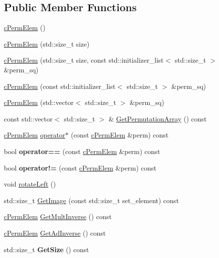 \subsection*{Public Member Functions}
\begin{DoxyCompactItemize}
\item 
\hyperlink{classcPermElem_a9170fa558dd3cdfae7879631db41235d}{c\-Perm\-Elem} ()
\item 
\hyperlink{classcPermElem_ad3ff2e93580acca710249f0eb7e04bc3}{c\-Perm\-Elem} (std\-::size\-\_\-t size)
\item 
\hyperlink{classcPermElem_a375e3da4877dd48e93ca192bfcd66ddd}{c\-Perm\-Elem} (std\-::size\-\_\-t size, const std\-::initializer\-\_\-list$<$ std\-::size\-\_\-t $>$ \&perm\-\_\-sq)
\item 
\hyperlink{classcPermElem_a88b976442227c8da9ede9cf9d3f865c5}{c\-Perm\-Elem} (const std\-::initializer\-\_\-list$<$ std\-::size\-\_\-t $>$ \&perm\-\_\-sq)
\item 
\hyperlink{classcPermElem_a05895c11888d83bc3d35b3c18d90e8e4}{c\-Perm\-Elem} (std\-::vector$<$ std\-::size\-\_\-t $>$ \&perm\-\_\-sq)
\item 
const std\-::vector$<$ std\-::size\-\_\-t $>$ \& \hyperlink{classcPermElem_a1b5d12f8fb6131643253f5ed3bad6c28}{Get\-Permutation\-Array} () const 
\item 
\hyperlink{classcPermElem}{c\-Perm\-Elem} \hyperlink{classcPermElem_a19da6e521f8adf3d252250f3836c563e}{operator$\ast$} (const \hyperlink{classcPermElem}{c\-Perm\-Elem} \&perm) const 
\item 
\hypertarget{classcPermElem_a925aac2e4ac73ec288b7a1e16b941d40}{bool {\bfseries operator==} (const \hyperlink{classcPermElem}{c\-Perm\-Elem} \&perm) const }\label{classcPermElem_a925aac2e4ac73ec288b7a1e16b941d40}

\item 
\hypertarget{classcPermElem_a925cdee12dcc4914417143a88d91c49d}{bool {\bfseries operator!=} (const \hyperlink{classcPermElem}{c\-Perm\-Elem} \&perm) const }\label{classcPermElem_a925cdee12dcc4914417143a88d91c49d}

\item 
void \hyperlink{classcPermElem_afa5694d1831e653f4cc3b12de6bb058e}{rotate\-Left} ()
\item 
std\-::size\-\_\-t \hyperlink{classcPermElem_adad3b042383cf3538bfec790188987c3}{Get\-Image} (const std\-::size\-\_\-t set\-\_\-element) const 
\item 
\hyperlink{classcPermElem}{c\-Perm\-Elem} \hyperlink{classcPermElem_adbb23b8a368e0d01cd2b450ad0be5efb}{Get\-Mult\-Inverse} () const 
\item 
\hyperlink{classcPermElem}{c\-Perm\-Elem} \hyperlink{classcPermElem_a11cc987f70282d2984c04c6e058c41e8}{Get\-Ad\-Inverse} () const 
\item 
\hypertarget{classcPermElem_a773fc9acee08d4c86d391439574eaf3e}{std\-::size\-\_\-t {\bfseries Get\-Size} () const }\label{classcPermElem_a773fc9acee08d4c86d391439574eaf3e}


\end{DoxyCompactItemize}
